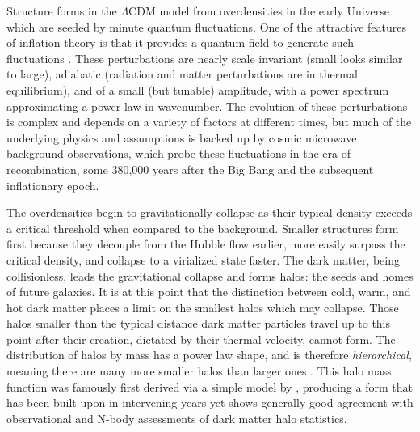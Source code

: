 Structure forms in the $\Lambda$CDM model from overdensities in the early Universe which are seeded by minute quantum fluctuations. One of the attractive features of inflation theory is that it provides a quantum field to generate such fluctuations \parencite{hawking82,guth82,starobinsky82}. These perturbations are nearly scale invariant (small looks similar to large), adiabatic (radiation and matter perturbations are in thermal equilibrium), and of a small (but tunable) amplitude, with a power spectrum approximating a power law in wavenumber. The evolution of these perturbations is complex and depends on a variety of factors at different times, but much of the underlying physics and assumptions is backed up by cosmic microwave background observations, which probe these fluctuations in the era of recombination, some 380,000 years after the Big Bang and the subsequent inflationary epoch.

The overdensities begin to gravitationally collapse as their typical density exceeds a critical threshold when compared to the background. Smaller structures form first because they decouple from the Hubble flow earlier, more easily surpass the critical density, and collapse to a virialized state faster. The dark matter, being collisionless, leads the gravitational collapse and forms halos: the seeds and homes of future galaxies. It is at this point that the distinction between cold, warm, and hot dark matter places a limit on the smallest halos which may collapse. Those halos smaller than the typical distance dark matter particles travel up to this point after their creation, dictated by their thermal velocity, cannot form. The distribution of halos by mass has a power law shape, and is therefore \textit{hierarchical}, meaning there are many more smaller halos than larger ones \parencite{gao04,tinker08}. This halo mass function was famously first derived via a simple model by \textcite{press74}, producing a form that has been built upon in intervening years \parencite{bond91,sheth99,sheth01} yet shows generally good agreement with observational and N-body assessments of dark matter halo statistics.

